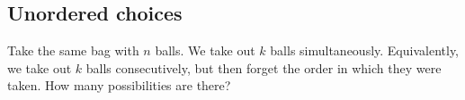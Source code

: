 

\setcounter{section}{2}
\setcounter{subsection}{4}
\setcounter{dfn}{10}

\subsection{Unordered choices}
Take the same bag with $n$ balls.
We take out $k$ balls simultaneously.
Equivalently, we take out $k$ balls consecutively, but then forget the order in which they were taken.
How many possibilities are there?


